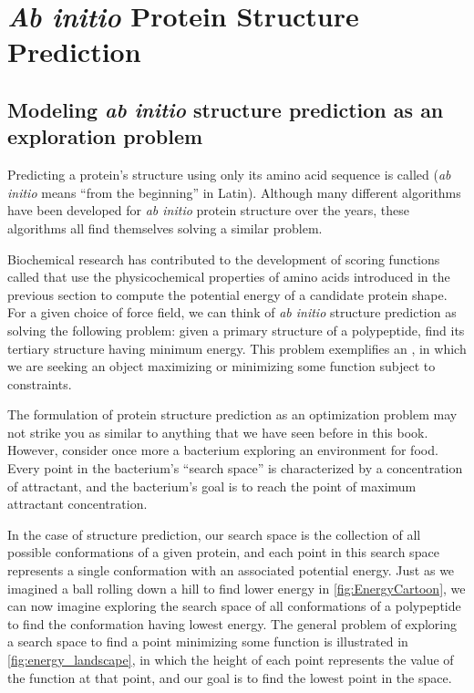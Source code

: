 \FloatBarrier
{}

\section{\textit{Ab initio} Protein Structure Prediction}
\label{sec:ab_initio}

\subsection{Modeling \textit{ab initio} structure prediction as an exploration problem}

Predicting a protein’s structure using only its amino acid sequence is called  (\textit{ab initio} means “from the beginning” in Latin). Although many different algorithms have been developed for \textit{ab initio} protein structure over the years, these algorithms all find themselves solving a similar problem.

Biochemical research has contributed to the development of scoring functions called  that use the physicochemical properties of amino acids introduced in the previous section to compute the potential energy of a candidate protein shape. For a given choice of force field, we can think of \textit{ab initio} structure prediction as solving the following problem: given a primary structure of a polypeptide, find its tertiary structure having minimum energy. This problem exemplifies an , in which we are seeking an object maximizing or minimizing some function subject to constraints.

The formulation of protein structure prediction as an optimization problem may not strike you as similar to anything that we have seen before in this book. However, consider once more a bacterium exploring an environment for food. Every point in the bacterium's ``search space'' is characterized by a concentration of attractant, and the bacterium's goal is to reach the point of maximum attractant concentration.

In the case of structure prediction, our search space is the collection of all possible conformations of a given protein, and each point in this search space represents a single conformation with an associated potential energy.  Just as we imagined a ball rolling down a hill to find lower energy in \autoref{fig:EnergyCartoon}, we can now imagine exploring the search space of all conformations of a polypeptide to find the conformation having lowest energy. The general problem of exploring a search space to find a point minimizing some function is illustrated in \autoref{fig:energy_landscape}, in which the height of each point represents the value of the function at that point, and our goal is to find the lowest point in the space.

